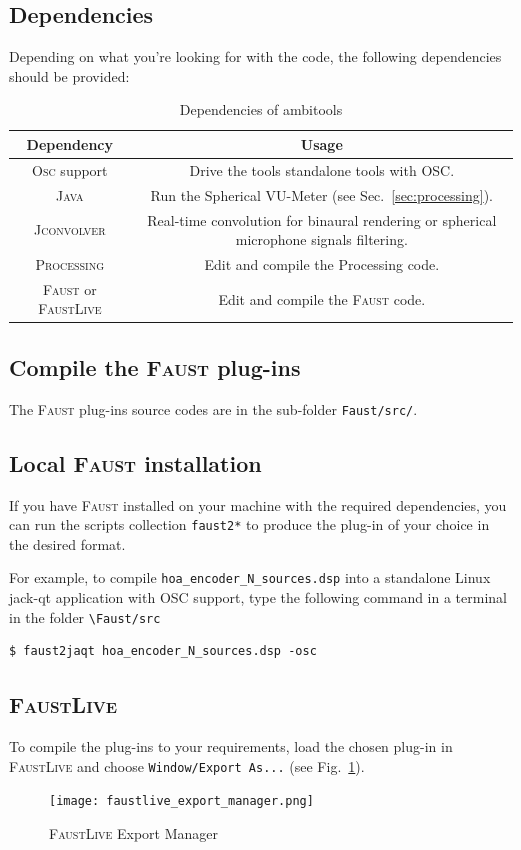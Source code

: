 \documentclass[10pt,a4paper]{article}
\begin{document}
\subsection{Dependencies}
Depending on what you're looking for with the code, the following dependencies should be provided:
\begin{table}[!ht]
\centering
\begin{tabular}{|c|c|}
\hline 
Dependency & Usage \\ 
\hline 
\textsc{Osc} support & Drive the tools standalone tools with OSC. \\
\hline
\textsc{Java} & Run the Spherical VU-Meter (see Sec.~\ref{sec:processing}). \\
\hline
\textsc{Jconvolver} & Real-time convolution for binaural rendering or spherical microphone signals filtering.\\
\hline
\textsc{Processing} & Edit and compile the Processing code. \\
\hline
\textsc{Faust} or \textsc{FaustLive}  & Edit and compile the \textsc{Faust} code.\\
\hline
\end{tabular}
\caption{Dependencies of ambitools}
\end{table}

\subsection{Compile the \textsc{Faust} plug-ins}
The \textsc{Faust} plug-ins source codes are in the sub-folder \lstinline'Faust/src/'. 

\subsection{Local \textsc{Faust} installation}
If you have \textsc{Faust} installed on your machine with the required dependencies, you can run the scripts collection \lstinline'faust2*' to produce the plug-in of your choice in the desired format. 

For example, to compile \lstinline'hoa_encoder_N_sources.dsp' into a standalone Linux jack-qt application with \textsc{OSC} support, type the following command in a terminal in the folder \lstinline'\Faust/src'

\begin{lstlisting}
$ faust2jaqt hoa_encoder_N_sources.dsp -osc
\end{lstlisting}

\subsection{\textsc{FaustLive}}
To compile the plug-ins to your requirements, load the chosen plug-in in \textsc{FaustLive} and choose \lstinline'Window/Export As...' (see Fig.~\ref{fig:faustlive}).
\begin{figure}[!ht]
\centering
\texttt{[image: faustlive\_export\_manager.png]}
\caption{\textsc{FaustLive} Export Manager}
\label{fig:faustlive}
\end{figure}
\end{document}
